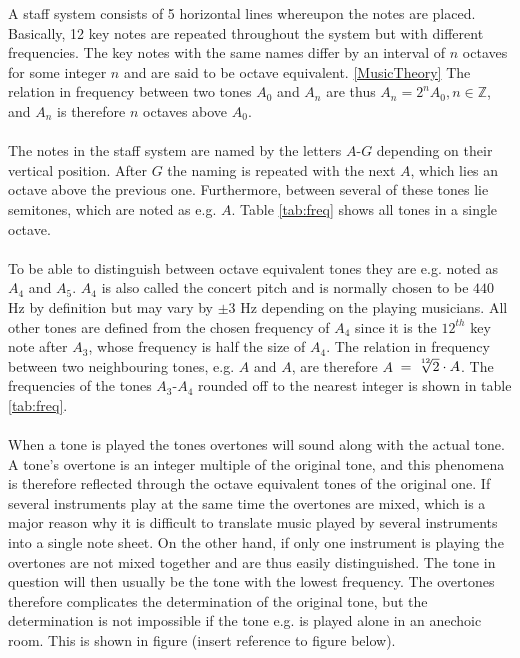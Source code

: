 A staff system consists of 5 horizontal lines whereupon the notes are placed. Basically, 12 key notes are repeated throughout the system but with different frequencies. The key notes with the same names differ by an interval of $n$ octaves for some integer $n$ and are said to be octave equivalent. \ref{MusicTheory} The relation in frequency between two tones $A_0$ and $A_n$ are thus $A_n = 2^n A_0, n \in \mathbb{Z}$, and $A_n$ is therefore $n$ octaves above $A_0$.
\\ \\
The notes in the staff system are named by the letters $A$-$G$ depending on their vertical position. After $G$ the naming is repeated with the next $A$, which lies an octave above the previous one. Furthermore, between several of these tones lie semitones, which are noted as e.g. $A$\hashsharp{}. Table \ref{tab:freq} shows all tones in a single octave.
\\ \\
To be able to distinguish between octave equivalent tones they are e.g. noted as $A_4$ and $A_5$. $A_4$ is also called the concert pitch and is normally chosen to be $440$ Hz by definition but may vary by $\pm 3$ Hz depending on the playing musicians. All other tones are defined from the chosen frequency of $A_4$ since it is the $12^{th}$ key note after $A_3$, whose frequency is half the size of $A_4$. The relation in frequency between two neighbouring tones, e.g. $A$ and $A$\hashsharp, are therefore $A$\hashsharp \ $= \sqrt[\leftroot{-2}\uproot{2}12]{2} \cdot A$. \cite{MusicTheory} The frequencies of the tones $A_3$-$A_4$ rounded off to the nearest integer is shown in table \ref{tab:freq}.
\\ \\
When a tone is played the tones overtones will sound along with the actual tone. A tone's overtone is an integer multiple of the original tone, and this phenomena is therefore reflected through the octave equivalent tones of the original one. If several instruments play at the same time the overtones are mixed, which is a major reason why it is difficult to translate music played by several instruments into a single note sheet. On the other hand, if only one instrument is playing the overtones are not mixed together and are thus easily distinguished. The tone in question will then usually be the tone with the lowest frequency. The overtones therefore complicates the determination of the original tone, but the determination is not impossible if the tone e.g. is played alone in an anechoic room. This is shown in figure (insert reference to figure below).
